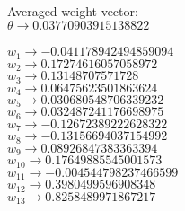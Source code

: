 \begin{enumerate}
\begin{enumerate}
					Averaged weight vector: \\
					\( \theta \rightarrow 0.03770903915138822 \) \\ \\
					
					\( w_{1} \rightarrow -0.041178942494859094 \) \\
					\( w_{2} \rightarrow 0.17274616057058972 \) \\
					\( w_{3} \rightarrow 0.13148707571728 \) \\
					\( w_{4} \rightarrow 0.06475623501863624 \) \\
					\( w_{5} \rightarrow 0.030680548706339232 \) \\
					\( w_{6} \rightarrow 0.032487241176698975 \) \\
					\( w_{7} \rightarrow -0.12672389222628322 \) \\
					\( w_{8} \rightarrow -0.13156694037154992 \) \\
					\( w_{9} \rightarrow 0.08926847383363394 \) \\
					\( w_{10} \rightarrow 0.17649885545001573 \) \\
					\( w_{11} \rightarrow -0.004544798237466599 \) \\
					\( w_{12} \rightarrow 0.3980499596908348 \) \\
					\( w_{13} \rightarrow 0.8258489971867217 \) \\


\end{enumerate}
\end{enumerate}
